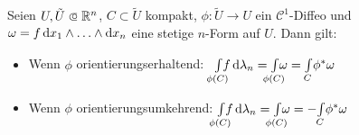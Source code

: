 \documentclass{cheat-sheet}
\newcommand{\Cont}{\mathcal{C}} %
\theoremstyle{definition}
\newcommand{\Intdf}[2]{{\textstyle \int\limits_{#1}} #2} %
\begin{document}
\begin{satz}
  Seien $U, \tilde{U} \opn \R^n$, $C \subset \tilde{U}$ kompakt, $\phi : \tilde{U} \to U$ ein $\Cont^1$-Diffeo und $\omega = f \, \mathrm{d} x_1 \wedge \ldots \wedge \mathrm{d} x_n$ eine stetige $n$-Form auf $U$. Dann gilt:
  \begin{itemize}
    \item Wenn $\phi$ orientierungserhaltend: \quad\, $\Int{\mathclap{\phi(C)}}{}{f}{\lambda_n} = \Intdf{\mathclap{\phi(C)}}{\omega} = \Intdf{C}{\phi^* \omega}$
    \item Wenn $\phi$ orientierungsumkehrend: \enspace $\Int{\mathclap{\phi(C)}}{}{f}{\lambda_n} = \Intdf{\mathclap{\phi(C)}}{\omega} = -\Intdf{C}{\phi^* \omega}$
  \end{itemize}
\end{satz}
\end{document}
